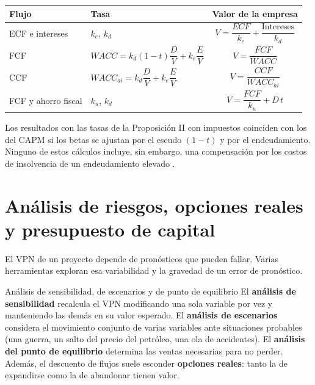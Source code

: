 \begin{formulaBox}
\begin{center}
\begin{tabular}{@{}llc@{}}
\toprule
Flujo & Tasa & Valor de la empresa\\
\midrule
ECF e intereses & $k_e$, $k_d$ & $V = \dfrac{ECF}{k_e} + \dfrac{\text{Intereses}}{k_d}$\\[8pt]
FCF & $WACC = k_d(1-t)\dfrac{D}{V} + k_e\dfrac{E}{V}$ & $V = \dfrac{FCF}{WACC}$\\[8pt]
CCF & $WACC_{ai} = k_d\dfrac{D}{V} + k_e\dfrac{E}{V}$ & $V = \dfrac{CCF}{WACC_{ai}}$\\[8pt]
FCF y ahorro fiscal & $k_u$, $k_d$ & $V = \dfrac{FCF}{k_u} + D\,t$\\
\bottomrule
\end{tabular}
\end{center}
\end{formulaBox}

Los resultados con las tasas de la Proposición II con impuestos coinciden con los del CAPM si los betas se ajustan por el escudo $(1-t)$ y por el endeudamiento. Ninguno de estos cálculos incluye, sin embargo, una compensación por los costos de insolvencia de un endeudamiento elevado .

\section{Análisis de riesgos, opciones reales y presupuesto de capital}\label{sec:u3-escenarios}

El VPN de un proyecto depende de pronósticos que pueden fallar. Varias herramientas exploran esa variabilidad y la gravedad de un error de pronóstico.

\begin{definicion}{Análisis de sensibilidad, de escenarios y de punto de equilibrio}
El \textbf{análisis de sensibilidad} recalcula el VPN modificando una sola variable por vez y manteniendo las demás en su valor esperado. El \textbf{análisis de escenarios} considera el movimiento conjunto de varias variables ante situaciones probables (una guerra, un salto del precio del petróleo, una ola de accidentes). El \textbf{análisis del punto de equilibrio} determina las ventas necesarias para no perder. Además, el descuento de flujos suele esconder \textbf{opciones reales}: tanto la de expandirse como la de abandonar tienen valor.
\end{definicion}

